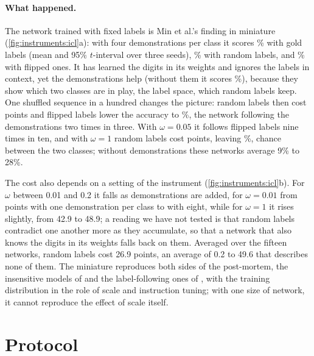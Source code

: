 \begin{refsection}
\paragraph{What happened.} The network trained with fixed labels is Min et al.'s finding in miniature (\cref{fig:instruments:icl}a): with four demonstrations per class it scores \% with gold labels (mean and 95\% $t$-interval over three seeds), \% with random labels, and \% with flipped ones. It has learned the digits in its weights and ignores the labels in context, yet the demonstrations help (without them it scores \%), because they show which two classes are in play, the label space, which random labels keep. One shuffled sequence in a hundred changes the picture: random labels then cost  points and flipped labels lower the accuracy to \%, the network following the demonstrations two times in three. With $\omega=0.05$ it follows flipped labels nine times in ten, and with $\omega=1$ random labels cost  points, leaving \%, chance between the two classes; without demonstrations these networks average 9\% to 28\%.

The cost also depends on a setting of the instrument (\cref{fig:instruments:icl}b). For $\omega$ between 0.01 and 0.2 it falls as demonstrations are added, for $\omega=0.01$ from  points with one demonstration per class to  with eight, while for $\omega=1$ it rises slightly, from 42.9 to 48.9; a reading we have not tested is that random labels contradict one another more as they accumulate, so that a network that also knows the digits in its weights falls back on them. Averaged over the fifteen networks, random labels cost 26.9 points, an average of 0.2 to 49.6 that describes none of them. The miniature reproduces both sides of the post-mortem, the insensitive models of \textcite{MinEtAl2022} and the label-following ones of \textcite{WeiEtAl2023larger}, with the training distribution in the role of scale and instruction tuning; with one size of network, it cannot reproduce the effect of scale itself.

\section{Protocol}\label{sec:instruments:protocol}


\end{refsection}
